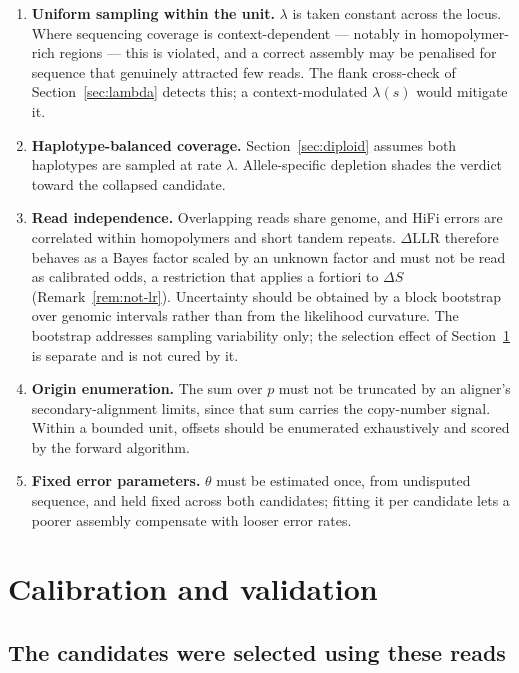 \documentclass[11pt]{article}
\begin{document}
\begin{enumerate}
    \item \textbf{Uniform sampling within the unit.}  $\lambda$ is taken
          constant across the locus.  Where sequencing coverage is
          context-dependent --- notably in homopolymer-rich regions --- this is
          violated, and a correct assembly may be penalised for sequence that
          genuinely attracted few reads.  The flank cross-check of
          Section~\ref{sec:lambda} detects this; a context-modulated
          $\lambda(s)$ would mitigate it.
    \item \textbf{Haplotype-balanced coverage.}  Section~\ref{sec:diploid}
          assumes both haplotypes are sampled at rate $\lambda$.  Allele-specific
          depletion shades the verdict toward the collapsed candidate.
    \item \textbf{Read independence.}  Overlapping reads share genome, and HiFi
          errors are correlated within homopolymers and short tandem repeats.
          $\Delta\mathrm{LLR}$ therefore behaves as a Bayes factor scaled by
          an unknown factor and must not be read as calibrated odds, a
          restriction that applies a fortiori to $\Delta S$
          (Remark~\ref{rem:not-lr}).  Uncertainty
          should be obtained by a block bootstrap over genomic intervals rather
          than from the likelihood curvature.  The bootstrap addresses sampling
          variability only; the selection effect of
          Section~\ref{sec:validation} is separate and is not cured by it.
    \item \textbf{Origin enumeration.}  The sum over $p$ must not be truncated by
          an aligner's secondary-alignment limits, since that sum carries the
          copy-number signal.  Within a bounded unit, offsets should be
          enumerated exhaustively and scored by the forward algorithm.
    \item \textbf{Fixed error parameters.}  $\theta$ must be estimated once, from
          undisputed sequence, and held fixed across both candidates; fitting it
          per candidate lets a poorer assembly compensate with looser error
          rates.
\end{enumerate}

\section{Calibration and validation}
\label{sec:validation}

\subsection{The candidates were selected using these reads}
\end{document}
